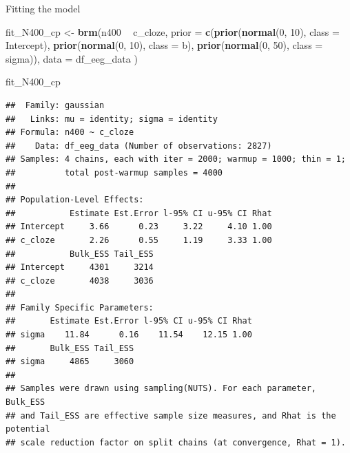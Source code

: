 \documentclass[12pt,ignorenonframetext,aspectratio=169]{beamer}
\newenvironment{Shaded}{\begin{snugshade}}{\end{snugshade}}
\newcommand{\DataTypeTok}[1]{\textcolor[rgb]{0.13,0.29,0.53}{#1}}
\newcommand{\DecValTok}[1]{\textcolor[rgb]{0.00,0.00,0.81}{#1}}
\newcommand{\KeywordTok}[1]{\textcolor[rgb]{0.13,0.29,0.53}{\textbf{#1}}}
\newcommand{\NormalTok}[1]{#1}
\newcommand{\OperatorTok}[1]{\textcolor[rgb]{0.81,0.36,0.00}{\textbf{#1}}}
\newcommand{\StringTok}[1]{\textcolor[rgb]{0.31,0.60,0.02}{#1}}
\begin{document}
\begin{frame}[fragile]{Fitting the model}
\protect\hypertarget{fitting-the-model}{}

\small

\begin{Shaded}
\begin{Highlighting}[]
\NormalTok{fit_N400_cp <-}\StringTok{ }\KeywordTok{brm}\NormalTok{(n400 }\OperatorTok{~}\StringTok{ }\NormalTok{c_cloze,}
  \DataTypeTok{prior =}
    \KeywordTok{c}\NormalTok{(}\KeywordTok{prior}\NormalTok{(}\KeywordTok{normal}\NormalTok{(}\DecValTok{0}\NormalTok{, }\DecValTok{10}\NormalTok{), }\DataTypeTok{class =}\NormalTok{ Intercept),}
      \KeywordTok{prior}\NormalTok{(}\KeywordTok{normal}\NormalTok{(}\DecValTok{0}\NormalTok{, }\DecValTok{10}\NormalTok{), }\DataTypeTok{class =}\NormalTok{ b),}
      \KeywordTok{prior}\NormalTok{(}\KeywordTok{normal}\NormalTok{(}\DecValTok{0}\NormalTok{, }\DecValTok{50}\NormalTok{), }\DataTypeTok{class =}\NormalTok{ sigma)),}
  \DataTypeTok{data =}\NormalTok{ df_eeg_data}
\NormalTok{)}
\end{Highlighting}
\end{Shaded}

\normalsize

\end{frame}

\begin{frame}[fragile]

\scriptsize

\begin{Shaded}
\begin{Highlighting}[]
\NormalTok{fit_N400_cp}
\end{Highlighting}
\end{Shaded}

\begin{verbatim}
##  Family: gaussian 
##   Links: mu = identity; sigma = identity 
## Formula: n400 ~ c_cloze 
##    Data: df_eeg_data (Number of observations: 2827) 
## Samples: 4 chains, each with iter = 2000; warmup = 1000; thin = 1;
##          total post-warmup samples = 4000
## 
## Population-Level Effects: 
##           Estimate Est.Error l-95% CI u-95% CI Rhat
## Intercept     3.66      0.23     3.22     4.10 1.00
## c_cloze       2.26      0.55     1.19     3.33 1.00
##           Bulk_ESS Tail_ESS
## Intercept     4301     3214
## c_cloze       4038     3036
## 
## Family Specific Parameters: 
##       Estimate Est.Error l-95% CI u-95% CI Rhat
## sigma    11.84      0.16    11.54    12.15 1.00
##       Bulk_ESS Tail_ESS
## sigma     4865     3060
## 
## Samples were drawn using sampling(NUTS). For each parameter, Bulk_ESS
## and Tail_ESS are effective sample size measures, and Rhat is the potential
## scale reduction factor on split chains (at convergence, Rhat = 1).
\end{verbatim}

\normalsize

\end{frame}
\end{document}
